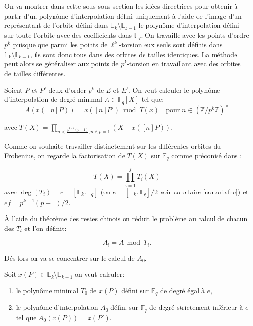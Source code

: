 \documentclass[10pt,a4paper]{book}
\theoremstyle{plain}
\theoremstyle{definition}
\theoremstyle{definition}
\theoremstyle{definition}
\theoremstyle{definition}
\theoremstyle{remark}
\theoremstyle{remark}
\theoremstyle{definition}
\begin{document}
On va montrer dans cette sous-sous-section les idées directrices pour obtenir à partir 
d'un polynôme d'interpolation défini uniquement à l'aide de l'image d'un 
représentant de l'orbite défini dans $\mathbb{L}_k \setminus \mathbb{L}_{k-1}$ 
le polynôme d'interpolation défini sur toute l'orbite avec des coefficients 
dans $\mathbb{F}_q$. On travaille avec les points d'ordre $p^k$ puisque que 
parmi les points de $\ell^k$-torsion eux seuls sont définis dans 
$\mathbb{L}_k \setminus \mathbb{L}_{k-1}$, ils sont donc tous dans des orbites 
de tailles identiques. La méthode peut alors se généraliser aux points de 
$p^k$-torsion en travaillant avec des orbites de tailles différentes.

Soient $P$ et $P'$ deux d'order $p^k$ de $E$ et $E'$. On veut calculer le 
polynôme d'interpolation de degré minimal $A \in \mathbb{F}_q[X]$ tel que:
\begin{equation}
A(x([n]P))=x([n]P') \bmod T(x) \quad \text{pour } n \in \left( \mathbb{Z}/p^k\mathbb{Z} \right)^{\times}
\end{equation} 

avec $T(X)= \prod_{n < \frac{p^{k-1}(p-1)}{2}, n \wedge p =1} (X-x([n]P))$.

Comme on souhaite travailler distinctement sur les différentes orbites du Frobenius, on regarde la factorisation de $T(X)$ sur $\mathbb{F}_q$ comme préconisé dans \cite{Couveignes96}:

\begin{equation*}
T(X)=\prod_{i=1}^fT_{i}(X)
\end{equation*}
avec $\deg(T_i)=e=[\mathbb{L}_k:\mathbb{F}_q]$ (ou $e=[\mathbb{L}_k:\mathbb{F}_q]/2$ voir corollaire \ref{cor:orb:fro}) et $ef=p^{k-1}(p-1)/2$.

\`A l'aide du théorème des restes chinois on réduit le problème au calcul de chacun des $T_{i}$ et l'on définit:

\begin{equation}
A_{i}=A \bmod{T_{i}}.
\end{equation}

Dés lors on va se concentrer sur le calcul de $A_{0}$.


Soit $x(P) \in \mathbb{L}_k \setminus \mathbb{L}_{k-1}$ on veut 
calculer: 
\begin{enumerate}
\item le polynôme minimal $T_{0}$ de $x(P)$ défini sur $\mathbb{F}_q$ de degré égal à $e$,
\item le polynôme d'interpolation $A_0$ défini sur $\mathbb{F}_q$ de degré strictement inférieur à $e$ tel que $A_0(x(P))=x(P')$.
\end{enumerate}
\end{document}
